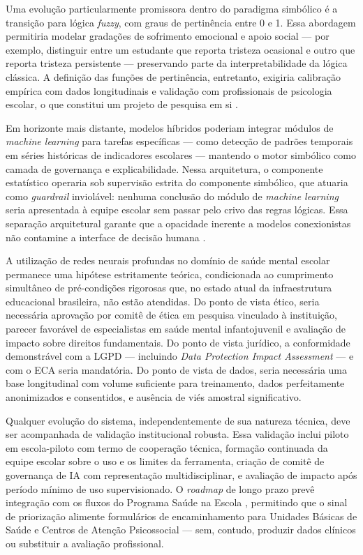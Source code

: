\documentclass[
    12pt,
    openright,
    oneside,
    a4paper,
    english,
    brazil
]{abntex2}
\begin{document}
Uma evolução particularmente promissora dentro do paradigma simbólico é a transição para lógica \textit{fuzzy}, com graus de pertinência entre 0 e 1. Essa abordagem permitiria modelar gradações de sofrimento emocional e apoio social --- por exemplo, distinguir entre um estudante que reporta tristeza ocasional e outro que reporta tristeza persistente --- preservando parte da interpretabilidade da lógica clássica. A definição das funções de pertinência, entretanto, exigiria calibração empírica com dados longitudinais e validação com profissionais de psicologia escolar, o que constitui um projeto de pesquisa em si \cite{russell_norvig_2022}.

Em horizonte mais distante, modelos híbridos poderiam integrar módulos de \textit{machine learning} para tarefas específicas --- como detecção de padrões temporais em séries históricas de indicadores escolares --- mantendo o motor simbólico como camada de governança e explicabilidade. Nessa arquitetura, o componente estatístico operaria sob supervisão estrita do componente simbólico, que atuaria como \textit{guardrail} inviolável: nenhuma conclusão do módulo de \textit{machine learning} seria apresentada à equipe escolar sem passar pelo crivo das regras lógicas. Essa separação arquitetural garante que a opacidade inerente a modelos conexionistas não contamine a interface de decisão humana \cite{jobin_ai_ethics_2019}.

A utilização de redes neurais profundas no domínio de saúde mental escolar permanece uma hipótese estritamente teórica, condicionada ao cumprimento simultâneo de pré-condições rigorosas que, no estado atual da infraestrutura educacional brasileira, não estão atendidas. Do ponto de vista ético, seria necessária aprovação por comitê de ética em pesquisa vinculado à instituição, parecer favorável de especialistas em saúde mental infantojuvenil e avaliação de impacto sobre direitos fundamentais. Do ponto de vista jurídico, a conformidade demonstrável com a LGPD \cite{brasil_lgpd_2018} --- incluindo \textit{Data Protection Impact Assessment} --- e com o ECA \cite{brasil_eca_1990} seria mandatória. Do ponto de vista de dados, seria necessária uma base longitudinal com volume suficiente para treinamento, dados perfeitamente anonimizados e consentidos, e ausência de viés amostral significativo.

Qualquer evolução do sistema, independentemente de sua natureza técnica, deve ser acompanhada de validação institucional robusta. Essa validação inclui piloto em escola-piloto com termo de cooperação técnica, formação continuada da equipe escolar sobre o uso e os limites da ferramenta, criação de comitê de governança de IA com representação multidisciplinar, e avaliação de impacto após período mínimo de uso supervisionado. O \textit{roadmap} de longo prazo prevê integração com os fluxos do Programa Saúde na Escola \cite{brasil_pse_2007}, permitindo que o sinal de priorização alimente formulários de encaminhamento para Unidades Básicas de Saúde e Centros de Atenção Psicossocial --- sem, contudo, produzir dados clínicos ou substituir a avaliação profissional.
\end{document}
